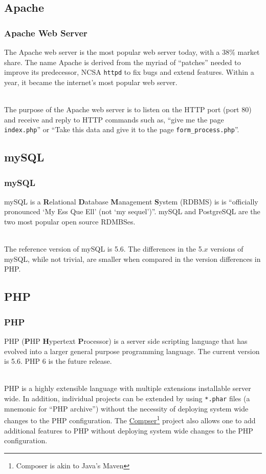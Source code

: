 \documentclass[aspectratio=169]{beamer}
\begin{document}
\subsection{Apache}
\begin{frame}
\frametitle{Apache Web Server}
The Apache web server is the most popular web server today, with a 38\% market share. \cite{netcraft} The name Apache is derived from the myriad of ``patches'' needed to improve its predecessor, NCSA \texttt{httpd} to fix bugs and extend features. Within a year, it became the internet's most popular web server. \cite{apache}

\pause
\mbox{}\\
The purpose of the Apache web server is to listen on the HTTP port (port 80) and receive and reply to HTTP commands such as, ``give me the page \texttt{index.php}'' or ``Take this data and give it to the page \texttt{form\_process.php}''.
\end{frame}

\subsection{mySQL}
\begin{frame}
\frametitle{mySQL}
mySQL is a \textbf{R}elational \textbf{D}atabase \textbf{M}anagement \textbf{S}ystem (RDBMS) is is ``officially pronounced `My Ess Que Ell' (not `my sequel')''. \cite{mysql} mySQL and PostgreSQL are the two most popular open source RDMBSes.

\mbox{}\\
The reference version of mySQL is 5.6. The differences in the 5.$x$ versions of mySQL, while not trivial, are smaller when compared in the version differences in PHP.
\end{frame}

\subsection{PHP}
\begin{frame}
\frametitle{PHP}
PHP (\textbf{P}HP \textbf{H}ypertext \textbf{P}rocessor) is a server side scripting language that has evolved into a larger general purpose programming language. The current version is 5.6. PHP 6 is the future release.

\mbox{}\\
PHP is a highly extensible language with multiple extensions installable server wide. In addition, individual projects can be extended by using \texttt{*.phar} files (a mnemonic for ``PHP archive'') without the necessity of deploying system wide changes to the PHP configuration. The \href{https://getcomposer.org/}{Compser}\footnote{Composer is akin to Java's Maven} project also allows one to add additional features to PHP without deploying system wide changes to the PHP configuration.
\end{frame}
\end{document}
